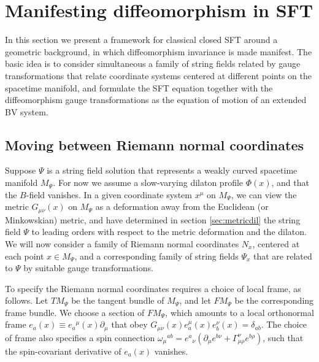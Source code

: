 \documentclass[12pt]{article}
\begin{document}
\section{Manifesting diffeomorphism in SFT}
\label{sec:extendedsft}


In this section we present a framework for classical closed SFT around a geometric background, in which diffeomorphism invariance is made manifest. The basic idea is to consider simultaneous a family of string fields related by gauge transformations that relate coordinate systems centered at different points on the spacetime manifold, and formulate the SFT equation together with the diffeomorphism gauge transformations as the equation of motion of an extended BV system.


\subsection{Moving between Riemann normal coordinates}

Suppose $\Psi$ is a string field solution that represents a weakly curved spacetime manifold $M_\Psi$. For now we assume a slow-varying dilaton profile $\Phi(x)$, and that the $B$-field vanishes. In a given coordinate system $x^\mu$ on $M_\Psi$, we can view the metric $G_{\mu\nu}(x)$ on $M_\Psi$ as a deformation away from the Euclidean (or Minkowskian) metric, and have determined in section \ref{sec:metricdil} the string field $\Psi$ to leading orders with respect to the metric deformation and the dilaton. We will now consider a family of Riemann normal coordinates $N_x$, centered at each point $x\in M_\Psi$, and a corresponding family of string fields $\Psi_x$ that are related to $\Psi$ by suitable gauge transformations.

To specify the Riemann normal coordinates requires a choice of local frame, as follows. Let $TM_\Psi$ be the tangent bundle of $M_\Psi$, and let $FM_\Psi$ be the corresponding frame bundle. We choose a section of $FM_\Psi$, which amounts to a local orthonormal frame $e_a(x)\equiv e_a{}^\mu(x) \partial_\mu$ that obey $G_{\mu\nu}(x) e_a^\mu(x) e_b^\nu(x) = \delta_{ab}$. The choice of frame also specifies a spin connection $\omega_\mu{}^{ab} = e^a{}_\nu (\partial_\mu e^{b \nu} + \Gamma_{\mu\rho}^\nu e^{b \rho})$, such that the spin-covariant derivative of $e_a(x)$ vanishes.
\end{document}

